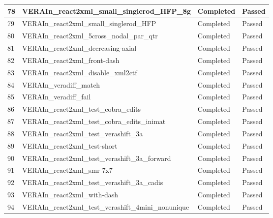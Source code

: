 \begin{longtable}[!ht]{|p{0.75cm}|p{11.25cm}|p{1.6cm}|p{1.1cm}|}
\rowcolor{caslcolor2}\small 78 & \small VERAIn\_react2xml\_small\_singlerod\_HFP\_8g & \small Completed & \small Passed \\\hline
\rowcolor{caslcolor1}\small 79 & \small VERAIn\_react2xml\_small\_singlerod\_HFP & \small Completed & \small Passed \\\hline
\rowcolor{caslcolor2}\small 80 & \small VERAIn\_react2xml\_5cross\_nodal\_par\_qtr & \small Completed & \small Passed \\\hline
\rowcolor{caslcolor1}\small 81 & \small VERAIn\_react2xml\_decreasing-axial & \small Completed & \small Passed \\\hline
\rowcolor{caslcolor2}\small 82 & \small VERAIn\_react2xml\_front-dash & \small Completed & \small Passed \\\hline
\rowcolor{caslcolor1}\small 83 & \small VERAIn\_react2xml\_disable\_xml2ctf & \small Completed & \small Passed \\\hline
\rowcolor{caslcolor2}\small 84 & \small VERAIn\_veradiff\_match & \small Completed & \small Passed \\\hline
\rowcolor{caslcolor1}\small 85 & \small VERAIn\_veradiff\_fail & \small Completed & \small Passed \\\hline
\rowcolor{caslcolor2}\small 86 & \small VERAIn\_react2xml\_test\_cobra\_edits & \small Completed & \small Passed \\\hline
\rowcolor{caslcolor1}\small 87 & \small VERAIn\_react2xml\_test\_cobra\_edits\_inimat & \small Completed & \small Passed \\\hline
\rowcolor{caslcolor2}\small 88 & \small VERAIn\_react2xml\_test\_verashift\_3a & \small Completed & \small Passed \\\hline
\rowcolor{caslcolor1}\small 89 & \small VERAIn\_react2xml\_test-short & \small Completed & \small Passed \\\hline
\rowcolor{caslcolor2}\small 90 & \small VERAIn\_react2xml\_test\_verashift\_3a\_forward & \small Completed & \small Passed \\\hline
\rowcolor{caslcolor1}\small 91 & \small VERAIn\_react2xml\_smr-7x7 & \small Completed & \small Passed \\\hline
\rowcolor{caslcolor2}\small 92 & \small VERAIn\_react2xml\_test\_verashift\_3a\_cadis & \small Completed & \small Passed \\\hline
\rowcolor{caslcolor1}\small 93 & \small VERAIn\_react2xml\_with-dash & \small Completed & \small Passed \\\hline
\rowcolor{caslcolor2}\small 94 & \small VERAIn\_react2xml\_test\_verashift\_4mini\_nonunique & \small Completed & \small Passed \\\hline

\end{longtable}
